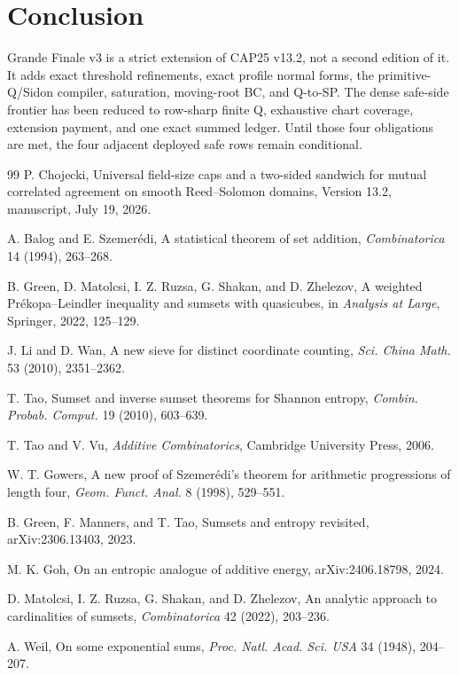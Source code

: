 \documentclass[11pt,a4paper]{amsart}
\numberwithin{equation}{section}
\theoremstyle{remark}
\begin{document}
\section{Conclusion}\label{sec:conclusion}
Grande Finale v3 is a strict extension of CAP25 v13.2, not a second edition of it.  It adds exact threshold refinements, exact profile normal forms, the primitive-Q/Sidon compiler, saturation, moving-root BC, and Q-to-SP.  The dense safe-side frontier has been reduced to row-sharp finite Q, exhaustive chart coverage, extension payment, and one exact summed ledger.  Until those four obligations are met, the four adjacent deployed safe rows remain conditional.


\begin{thebibliography}{99}
P. Chojecki,
\newblock Universal field-size caps and a two-sided sandwich for mutual correlated agreement on smooth Reed--Solomon domains,
\newblock Version 13.2, manuscript, July 19, 2026.

A. Balog and E. Szemer\'edi,
\newblock A statistical theorem of set addition,
\newblock \emph{Combinatorica} 14 (1994), 263--268.

B. Green, D. Matolcsi, I. Z. Ruzsa, G. Shakan, and D. Zhelezov,
\newblock A weighted Pr\'ekopa--Leindler inequality and sumsets with quasicubes,
\newblock in \emph{Analysis at Large}, Springer, 2022, 125--129.

J. Li and D. Wan,
\newblock A new sieve for distinct coordinate counting,
\newblock \emph{Sci. China Math.} 53 (2010), 2351--2362.

T. Tao,
\newblock Sumset and inverse sumset theorems for Shannon entropy,
\newblock \emph{Combin. Probab. Comput.} 19 (2010), 603--639.

T. Tao and V. Vu,
\newblock \emph{Additive Combinatorics},
\newblock Cambridge University Press, 2006.

W. T. Gowers,
\newblock A new proof of Szemer\'edi's theorem for arithmetic progressions of length four,
\newblock \emph{Geom. Funct. Anal.} 8 (1998), 529--551.

B. Green, F. Manners, and T. Tao,
\newblock Sumsets and entropy revisited,
\newblock arXiv:2306.13403, 2023.

M. K. Goh,
\newblock On an entropic analogue of additive energy,
\newblock arXiv:2406.18798, 2024.

D. Matolcsi, I. Z. Ruzsa, G. Shakan, and D. Zhelezov,
\newblock An analytic approach to cardinalities of sumsets,
\newblock \emph{Combinatorica} 42 (2022), 203--236.

A. Weil,
\newblock On some exponential sums,
\newblock \emph{Proc. Natl. Acad. Sci. USA} 34 (1948), 204--207.

\end{thebibliography}
\end{document}

